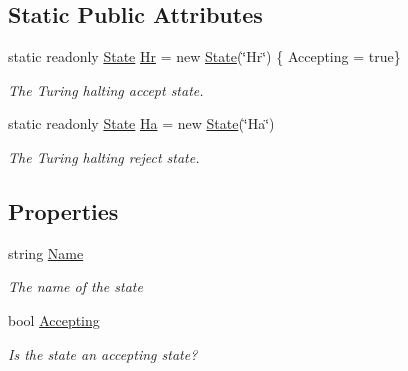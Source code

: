 \subsection*{Static Public Attributes}
\begin{DoxyCompactItemize}
\item 
static readonly \mbox{\hyperlink{class_system_1_1_automata_1_1_state}{State}} \mbox{\hyperlink{class_system_1_1_automata_1_1_state_adb68e0dc49813e402e113d26e7137660}{Hr}} = new \mbox{\hyperlink{class_system_1_1_automata_1_1_state}{State}}(\char`\"{}Hr\char`\"{}) \{ Accepting = true\}
\begin{DoxyCompactList}\small\item\em The Turing halting accept state. \end{DoxyCompactList}\item 
static readonly \mbox{\hyperlink{class_system_1_1_automata_1_1_state}{State}} \mbox{\hyperlink{class_system_1_1_automata_1_1_state_ae6639cebabe973cfa8825fedbc4ae741}{Ha}} = new \mbox{\hyperlink{class_system_1_1_automata_1_1_state}{State}}(\char`\"{}Ha\char`\"{})
\begin{DoxyCompactList}\small\item\em The Turing halting reject state. \end{DoxyCompactList}\end{DoxyCompactItemize}
\subsection*{Properties}
\begin{DoxyCompactItemize}
\item 
string \mbox{\hyperlink{class_system_1_1_automata_1_1_state_aba020a3d9150baf1bfd6dd27c93cf297}{Name}}
\begin{DoxyCompactList}\small\item\em The name of the state \end{DoxyCompactList}\item 
bool \mbox{\hyperlink{class_system_1_1_automata_1_1_state_a2a37b025bd8bf30defe28ae26e339e0e}{Accepting}}
\begin{DoxyCompactList}\small\item\em Is the state an accepting state? \end{DoxyCompactList}\end{DoxyCompactItemize}



